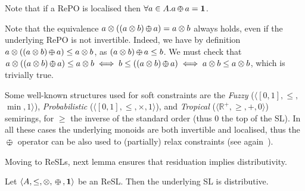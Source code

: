 \documentclass{llncs}
\def\monid{{\mathbf 0}}
\def\monop{\otimes}
\def\odiv{\, {\ominus\hspace{-7.7pt} \div} \,}
\def\monid{\mathbf{1}}
\begin{document}
Note that if a RePO is localised then $\forall a \in A. a \odiv a = \monid$.

\begin{remark}
	Note that the equivalence $a \otimes ((a \otimes b) \odiv a) = a \otimes b$ always holds, even if the 
	underlying RePO is not invertible. Indeed, we have by definition $a \otimes ((a \otimes b) \odiv a) 
	\leq a \otimes b$, as $(a \otimes b) \odiv a \leq b$. We must check that $a \otimes ((a \otimes b) 
	\odiv a) \leq a \otimes b \iff b \leq ((a \otimes b) \odiv a) \iff a \otimes b \leq a \otimes b$,
	which is trivially true.
\end{remark}

\begin{remark}\label{rmk:soft}
	Some well-known structures used for soft constraints are the 
	\emph{Fuzzy} ($\langle [0,1], \leq,$ $\min, 1 \rangle$), \emph{Probabilistic} ($\langle [0,1], \leq,\allowbreak\times, 1 \rangle$), 
	and \emph{Tropical}   ($\langle \mathbb{R}^+, \geq, +, 0 \rangle$) semirings, for $\geq$ the inverse of the standard order 
	(thus $0$ the top of the SL). In all these cases the underlying monoids 
	are both invertible and localised, thus
	the $\odiv$ operator can be also used to
	(partially) relax constraints (see again~\cite{ecai06}).
\end{remark}

Moving to ReSLs, next lemma ensures that residuation implies distributivity.

\begin{lemma}
	\label{dist2}
	Let $\langle A, \leq, \monop, \odiv, \monid \rangle$ be an ReSL.
	Then the underlying SL is distributive.
\end{lemma}
\end{document}
